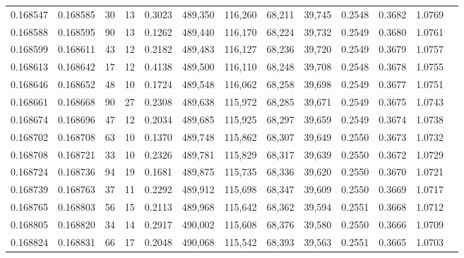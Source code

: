 \begin{tabular}{rrrrrrrrrrrrr}
0.168547 & 0.168585 &    30 &  13 &                                     0.3023 & 489,350 & 116,260 &  68,211 &  39,745 & 0.2548 & 0.3682 & 1.0769 \\
0.168588 & 0.168595 &    90 &  13 &                                     0.1262 & 489,440 & 116,170 &  68,224 &  39,732 & 0.2549 & 0.3680 & 1.0761 \\
0.168599 & 0.168611 &    43 &  12 &                                     0.2182 & 489,483 & 116,127 &  68,236 &  39,720 & 0.2549 & 0.3679 & 1.0757 \\
0.168613 & 0.168642 &    17 &  12 &                                     0.4138 & 489,500 & 116,110 &  68,248 &  39,708 & 0.2548 & 0.3678 & 1.0755 \\
0.168646 & 0.168652 &    48 &  10 &                                     0.1724 & 489,548 & 116,062 &  68,258 &  39,698 & 0.2549 & 0.3677 & 1.0751 \\
0.168661 & 0.168668 &    90 &  27 &                                     0.2308 & 489,638 & 115,972 &  68,285 &  39,671 & 0.2549 & 0.3675 & 1.0743 \\
0.168674 & 0.168696 &    47 &  12 &                                     0.2034 & 489,685 & 115,925 &  68,297 &  39,659 & 0.2549 & 0.3674 & 1.0738 \\
0.168702 & 0.168708 &    63 &  10 &                                     0.1370 & 489,748 & 115,862 &  68,307 &  39,649 & 0.2550 & 0.3673 & 1.0732 \\
0.168708 & 0.168721 &    33 &  10 &                                     0.2326 & 489,781 & 115,829 &  68,317 &  39,639 & 0.2550 & 0.3672 & 1.0729 \\
0.168724 & 0.168736 &    94 &  19 &                                     0.1681 & 489,875 & 115,735 &  68,336 &  39,620 & 0.2550 & 0.3670 & 1.0721 \\
0.168739 & 0.168763 &    37 &  11 &                                     0.2292 & 489,912 & 115,698 &  68,347 &  39,609 & 0.2550 & 0.3669 & 1.0717 \\
0.168765 & 0.168803 &    56 &  15 &                                     0.2113 & 489,968 & 115,642 &  68,362 &  39,594 & 0.2551 & 0.3668 & 1.0712 \\
0.168805 & 0.168820 &    34 &  14 &                                     0.2917 & 490,002 & 115,608 &  68,376 &  39,580 & 0.2550 & 0.3666 & 1.0709 \\
0.168824 & 0.168831 &    66 &  17 &                                     0.2048 & 490,068 & 115,542 &  68,393 &  39,563 & 0.2551 & 0.3665 & 1.0703 \\

\end{tabular}

